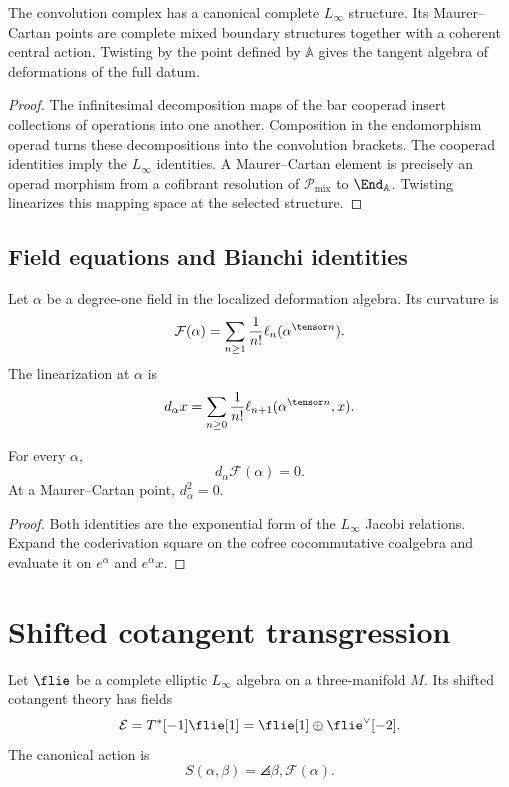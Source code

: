 \begin{theorem}
The convolution complex has a canonical complete $L_\infty$ structure.  Its Maurer--Cartan points are complete mixed boundary structures together with a coherent central action.  Twisting by the point defined by $\mathbb A$ gives the tangent algebra of deformations of the full datum.
\end{theorem}
\begin{proof}
The infinitesimal decomposition maps of the bar cooperad insert collections of operations into one another.  Composition in the endomorphism operad turns these decompositions into the convolution brackets.  The cooperad identities imply the $L_\infty$ identities.  A Maurer--Cartan element is precisely an operad morphism from a cofibrant resolution of $\mathcal P_{\mathrm{mix}}$ to $\End_{\mathbb A}$.  Twisting linearizes this mapping space at the selected structure.
\end{proof}

\section{Field equations and Bianchi identities}
Let $\alpha$ be a degree-one field in the localized deformation algebra.  Its curvature is
\[
 \mathcal F(\alpha)
 =\sum_{n\ge1}\frac1{n!}\ell_n(\alpha^{\tensor n}).
\]
The linearization at $\alpha$ is
\[
 d_\alpha x
 =\sum_{n\ge0}\frac1{n!}
   \ell_{n+1}(\alpha^{\tensor n},x).
\]

\begin{theorem}
For every $\alpha$,
\[
 d_\alpha\mathcal F(\alpha)=0.
\]
At a Maurer--Cartan point, $d_\alpha^2=0$.
\end{theorem}
\begin{proof}
Both identities are the exponential form of the $L_\infty$ Jacobi relations.  Expand the coderivation square on the cofree cocommutative coalgebra and evaluate it on $e^\alpha$ and $e^\alpha x$.
\end{proof}

\chapter{Shifted cotangent transgression}
Let $\flie$ be a complete elliptic $L_\infty$ algebra on a three-manifold $M$.  Its shifted cotangent theory has fields
\[
 \mathcal E=T^*[-1]\flie[1]
 =\flie[1]\oplus\flie^\vee[-2].
\]
The canonical action is
\[
 S(\alpha,\beta)
 =\angles{\beta,\mathcal F(\alpha)}.
\]

